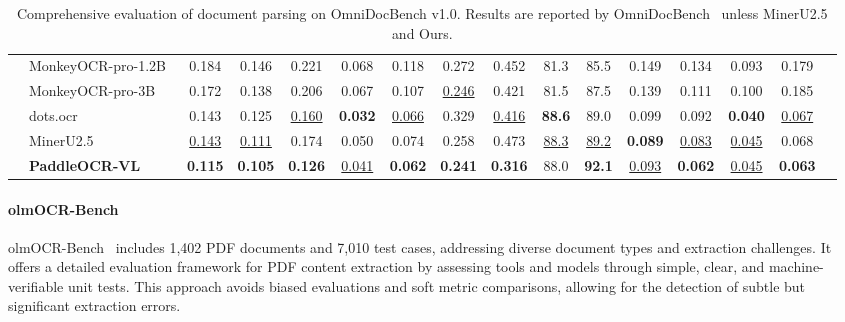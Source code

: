 \documentclass[11pt, a4paper,logo,  copyright, nonumbering]{paddleocr}
\begin{document}
\begin{table}[H]
{\begin{tabular}{l|l| c| cc|cc|cc|cc|cc|ccc}
        & MonkeyOCR-pro-1.2B~\cite{li2025monkeyocr} & 0.184 & 0.146 & 0.221 & 0.068 & 0.118 & 0.272 & 0.452 & 81.3 & 85.5 & 0.149 & 0.134 & 0.093 & 0.179 \\
            
    & MonkeyOCR-pro-3B~\cite{li2025monkeyocr} & 0.172 & 0.138 & 0.206 & 0.067 & 0.107 & \cellcolor{cyan!15}\underline{0.246} & 0.421 & 81.5&  87.5 & 0.139 & 0.111 & 0.100 & 0.185 \\
    & dots.ocr~\cite{dotsocr} & 0.143 & 0.125 & \cellcolor{cyan!15}\underline{0.160} & \cellcolor{red!15} \textbf{0.032} & \cellcolor{cyan!15}\underline{0.066} & 0.329 & \cellcolor{cyan!15}\underline{0.416} & \cellcolor{red!15}\textbf {88.6} & 89.0 & 0.099 & 0.092 & \cellcolor{red!15}\textbf{0.040} & \cellcolor{cyan!15}\underline{0.067} \\

    & MinerU2.5~\cite{niu2025mineru2} & \cellcolor{cyan!15}\underline{0.143} & \cellcolor{cyan!15}\underline{0.111} & 0.174 & 0.050 & 0.074 & 0.258 & 0.473 & \cellcolor{cyan!15}\underline{88.3} & \cellcolor{cyan!15}\underline{89.2} & \cellcolor{red!15}\textbf {0.089} & \cellcolor{cyan!15}\underline{0.083} & \cellcolor{cyan!15}\underline {0.045} & 0.068 \\
    
    &  \textbf{PaddleOCR-VL}  & \cellcolor{red!15} \textbf{0.115} & \cellcolor{red!15}\textbf{0.105} & \cellcolor{red!15}\textbf{0.126} & \cellcolor{cyan!15}\underline{0.041} & \cellcolor{red!15}\textbf{0.062} & \cellcolor{red!15}\textbf{0.241} & \cellcolor{red!15}\textbf{0.316} & 88.0 & \cellcolor{red!15}\textbf{92.1} & \cellcolor{cyan!15}\underline{0.093} & \cellcolor{red!15}\textbf{0.062} &\cellcolor{cyan!15}\underline{0.045} & \cellcolor{red!15}\textbf{0.063} \\
    \bottomrule
  \end{tabular}%
}
  \caption{Comprehensive evaluation of document parsing on OmniDocBench v1.0. Results are reported by OmniDocBench~\cite{ouyang2025omnidocbench} unless MinerU2.5 and Ours.}
  \label{tab:omni_performance}
\end{table}



\paragraph{olmOCR-Bench} olmOCR-Bench~\cite{poznanski2025olmocr} includes 1,402 PDF documents and 7,010 test cases, addressing diverse document types and extraction challenges. It offers a detailed evaluation framework for PDF content extraction by assessing tools and models through simple, clear, and machine-verifiable unit tests. This approach avoids biased evaluations and soft metric comparisons, allowing for the detection of subtle but significant extraction errors.
\end{document}
